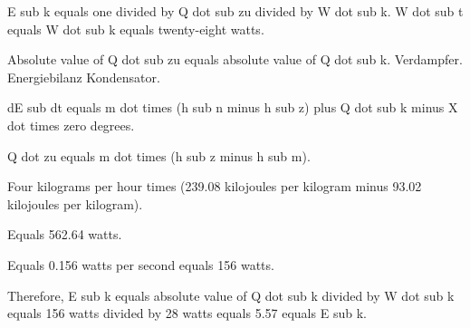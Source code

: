 E sub k equals one divided by Q dot sub zu divided by W dot sub k. W dot sub t equals W dot sub k equals twenty-eight watts.

Absolute value of Q dot sub zu equals absolute value of Q dot sub k. Verdampfer. Energiebilanz Kondensator.

dE sub dt equals m dot times (h sub n minus h sub z) plus Q dot sub k minus X dot times zero degrees.

Q dot zu equals m dot times (h sub z minus h sub m).

Four kilograms per hour times (239.08 kilojoules per kilogram minus 93.02 kilojoules per kilogram).

Equals 562.64 watts.

Equals 0.156 watts per second equals 156 watts.

Therefore, E sub k equals absolute value of Q dot sub k divided by W dot sub k equals 156 watts divided by 28 watts equals 5.57 equals E sub k.